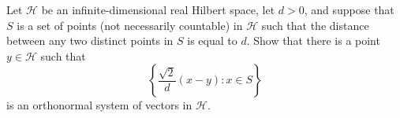 \documentclass{article}
\begin{document}
\setlength{\parindent}{0pt}
Let $\mathcal{H}$ be an infinite-dimensional real Hilbert space, let $d>0$, and suppose that $S$ is a set of points (not necessarily countable) in $\mathcal{H}$ such that the distance between any two distinct points in $S$ is equal to $d$. Show that there is a point $y\in\mathcal{H}$ such that$$\left\{\frac{\sqrt{2}}{d}(x-y):x\in S\right\}$$is an orthonormal system of vectors in $\mathcal{H}$.
\end{document}
